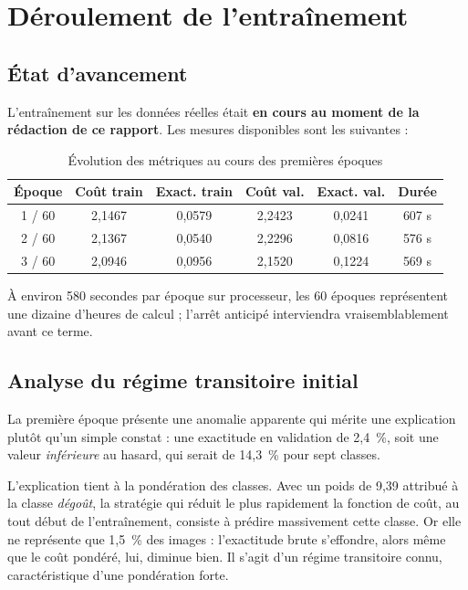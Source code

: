 \documentclass[a4paper,12pt]{report}
\begin{document}
\section{Déroulement de l'entraînement}

\subsection{État d'avancement}

L'entraînement sur les données réelles était \textbf{en cours au moment de la
rédaction de ce rapport}. Les mesures disponibles sont les suivantes :

\begin{table}[htbp]
\centering
\caption{Évolution des métriques au cours des premières époques}
\begin{tabular}{|c|c|c|c|c|c|}
\hline
\textbf{Époque} & \textbf{Coût train} & \textbf{Exact. train} & \textbf{Coût val.} & \textbf{Exact. val.} & \textbf{Durée} \\
\hline
1 / 60 & 2{,}1467 & 0{,}0579 & 2{,}2423 & 0{,}0241 & 607 s \\
2 / 60 & 2{,}1367 & 0{,}0540 & 2{,}2296 & 0{,}0816 & 576 s \\
3 / 60 & 2{,}0946 & 0{,}0956 & 2{,}1520 & 0{,}1224 & 569 s \\
\hline
\end{tabular}
\end{table}

À environ 580 secondes par époque sur processeur, les 60 époques représentent
une dizaine d'heures de calcul ; l'arrêt anticipé interviendra vraisemblablement
avant ce terme.

\subsection{Analyse du régime transitoire initial}

La première époque présente une anomalie apparente qui mérite une explication
plutôt qu'un simple constat : une exactitude en validation de 2{,}4~\%, soit une
valeur \emph{inférieure} au hasard, qui serait de 14{,}3~\% pour sept classes.

L'explication tient à la pondération des classes. Avec un poids de 9{,}39
attribué à la classe \emph{dégoût}, la stratégie qui réduit le plus rapidement
la fonction de coût, au tout début de l'entraînement, consiste à prédire
massivement cette classe. Or elle ne représente que 1{,}5~\% des images :
l'exactitude brute s'effondre, alors même que le coût pondéré, lui, diminue
bien. Il s'agit d'un régime transitoire connu, caractéristique d'une
pondération forte.
\end{document}
